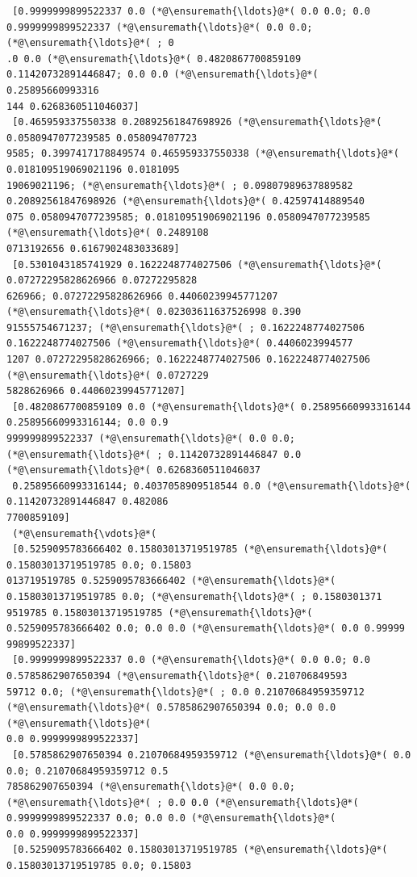 \documentclass[12pt,a4paper]{article}
\begin{document}
\begin{lstlisting}
 [0.9999999899522337 0.0 (*@\ensuremath{\ldots}@*( 0.0 0.0; 0.0 0.9999999899522337 (*@\ensuremath{\ldots}@*( 0.0 0.0; (*@\ensuremath{\ldots}@*( ; 0
.0 0.0 (*@\ensuremath{\ldots}@*( 0.4820867700859109 0.11420732891446847; 0.0 0.0 (*@\ensuremath{\ldots}@*( 0.25895660993316
144 0.6268360511046037]
 [0.465959337550338 0.20892561847698926 (*@\ensuremath{\ldots}@*( 0.0580947077239585 0.058094707723
9585; 0.3997417178849574 0.465959337550338 (*@\ensuremath{\ldots}@*( 0.018109519069021196 0.0181095
19069021196; (*@\ensuremath{\ldots}@*( ; 0.09807989637889582 0.20892561847698926 (*@\ensuremath{\ldots}@*( 0.42597414889540
075 0.0580947077239585; 0.018109519069021196 0.0580947077239585 (*@\ensuremath{\ldots}@*( 0.2489108
0713192656 0.6167902483033689]
 [0.5301043185741929 0.1622248774027506 (*@\ensuremath{\ldots}@*( 0.07272295828626966 0.07272295828
626966; 0.07272295828626966 0.44060239945771207 (*@\ensuremath{\ldots}@*( 0.02303611637526998 0.390
91555754671237; (*@\ensuremath{\ldots}@*( ; 0.1622248774027506 0.1622248774027506 (*@\ensuremath{\ldots}@*( 0.4406023994577
1207 0.07272295828626966; 0.1622248774027506 0.1622248774027506 (*@\ensuremath{\ldots}@*( 0.0727229
5828626966 0.44060239945771207]
 [0.4820867700859109 0.0 (*@\ensuremath{\ldots}@*( 0.25895660993316144 0.25895660993316144; 0.0 0.9
999999899522337 (*@\ensuremath{\ldots}@*( 0.0 0.0; (*@\ensuremath{\ldots}@*( ; 0.11420732891446847 0.0 (*@\ensuremath{\ldots}@*( 0.6268360511046037
 0.25895660993316144; 0.4037058909518544 0.0 (*@\ensuremath{\ldots}@*( 0.11420732891446847 0.482086
7700859109]
 (*@\ensuremath{\vdots}@*(
 [0.5259095783666402 0.15803013719519785 (*@\ensuremath{\ldots}@*( 0.15803013719519785 0.0; 0.15803
013719519785 0.5259095783666402 (*@\ensuremath{\ldots}@*( 0.15803013719519785 0.0; (*@\ensuremath{\ldots}@*( ; 0.1580301371
9519785 0.15803013719519785 (*@\ensuremath{\ldots}@*( 0.5259095783666402 0.0; 0.0 0.0 (*@\ensuremath{\ldots}@*( 0.0 0.99999
99899522337]
 [0.9999999899522337 0.0 (*@\ensuremath{\ldots}@*( 0.0 0.0; 0.0 0.5785862907650394 (*@\ensuremath{\ldots}@*( 0.210706849593
59712 0.0; (*@\ensuremath{\ldots}@*( ; 0.0 0.21070684959359712 (*@\ensuremath{\ldots}@*( 0.5785862907650394 0.0; 0.0 0.0 (*@\ensuremath{\ldots}@*( 
0.0 0.9999999899522337]
 [0.5785862907650394 0.21070684959359712 (*@\ensuremath{\ldots}@*( 0.0 0.0; 0.21070684959359712 0.5
785862907650394 (*@\ensuremath{\ldots}@*( 0.0 0.0; (*@\ensuremath{\ldots}@*( ; 0.0 0.0 (*@\ensuremath{\ldots}@*( 0.9999999899522337 0.0; 0.0 0.0 (*@\ensuremath{\ldots}@*( 
0.0 0.9999999899522337]
 [0.5259095783666402 0.15803013719519785 (*@\ensuremath{\ldots}@*( 0.15803013719519785 0.0; 0.15803

\end{lstlisting}
\end{document}
